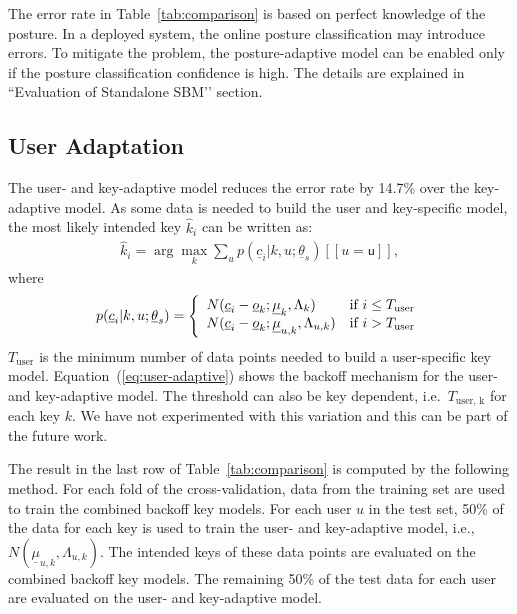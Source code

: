 \documentclass{sigchi}
\begin{document}
The error rate in Table~\ref{tab:comparison} is based on perfect knowledge of
the posture. In a deployed system, the online posture classification may
introduce errors. To mitigate the problem, the posture-adaptive model can be enabled only
if the posture classification confidence is high. The details are explained in ``Evaluation of Standalone SBM’’ section.

\subsection{User Adaptation}
The user- and key-adaptive model reduces the error rate by 14.7\% over the key-adaptive model. As some data is needed to build the user and key-specific model, the most likely intended key $\hat k_i$ can be written as:
\begin{align}          
\hat k_i = \arg\max_k \sum_{u} p(\underline c_i | k, u; \underline\theta_s)[[u = \textsf{u}]],
\end{align}
where
\begin{align}
p(\underline c_i | k, u; \underline\theta_s) = \left\{
 \begin{array}{l l}
 N(\underline c_i - \underline o_k; \underline \mu_{k}, \Lambda_{k}) & \text{if $i \le T_\text{user}$} \\
 N(\underline c_i -  \underline o_k; \underline \mu_{u, k}, \Lambda_{u, k}) & \text{if $i >T_\text{user}$} \\
\end{array} \right. \label{eq:user-adaptive}
\end{align}
$T_\text{user}$ is the minimum number of data points needed to build a user-specific key model. Equation~(\ref{eq:user-adaptive})
shows the backoff mechanism for the user- and key-adaptive model. The threshold can also be key dependent, i.e.\ $T_\text{user, k}$ for each key $k$. We have not experimented with this variation and this can be part of the future work.

The result in the last row of Table~\ref{tab:comparison} is computed by the
following method. For each fold of the cross-validation, data from the training set are used to
train the combined backoff key models. For each user $u$ in the test set,
50\% of the data for each key is used to train the user- and key-adaptive
model, i.e., $N(\underline \mu_{u, k}, \Lambda_{u, k})$.
The intended keys of these data points are evaluated on the combined backoff key models.
The remaining 50\% of the test data for each user are evaluated on the user- and key-adaptive
model.
\end{document}
